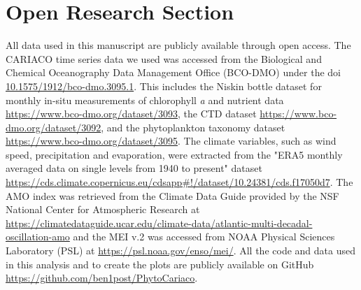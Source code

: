 \documentclass[draft]{agujournal2019}
\begin{document}
%








%
%

\section*{Open Research Section}
All data used in this manuscript are publicly available through open access. The CARIACO time series data we used was accessed from the Biological and Chemical Oceanography Data Management Office (BCO-DMO) under the doi \url{10.1575/1912/bco-dmo.3095.1}. This includes the Niskin bottle dataset for monthly in-situ measurements of chlorophyll \textit{a} and nutrient data \url{https://www.bco-dmo.org/dataset/3093}, the CTD dataset \url{https://www.bco-dmo.org/dataset/3092}, and the phytoplankton taxonomy dataset \url{https://www.bco-dmo.org/dataset/3095}.
The climate variables, such as wind speed, precipitation and evaporation, were extracted from the "ERA5 monthly averaged data on single levels from 1940 to present" dataset \url{https://cds.climate.copernicus.eu/cdsapp#!/dataset/10.24381/cds.f17050d7}.
The AMO index was retrieved from the Climate Data Guide provided by the NSF National Center for Atmospheric Research at \url{https://climatedataguide.ucar.edu/climate-data/atlantic-multi-decadal-oscillation-amo} and the MEI v.2 was accessed from NOAA Physical Sciences Laboratory (PSL) at \url{https://psl.noaa.gov/enso/mei/}.
All the code and data used in this analysis and to create the plots are publicly available on GitHub \url{https://github.com/ben1post/PhytoCariaco}.
\end{document}
